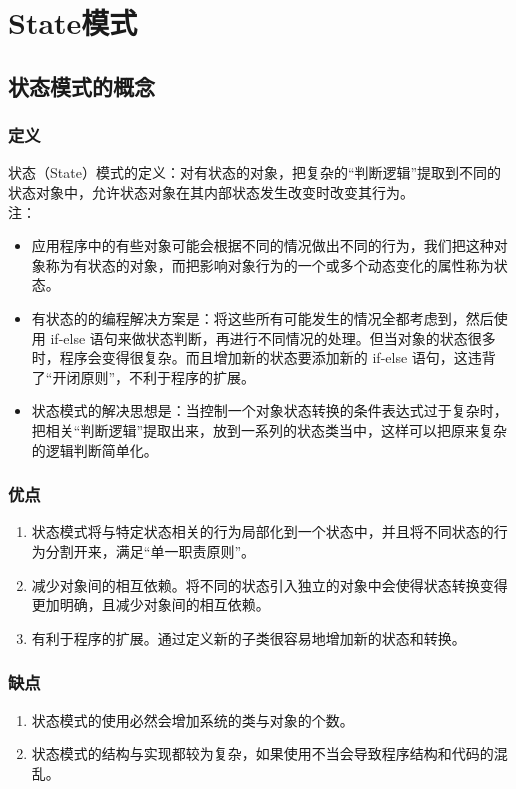 \chapter{State模式}
\section{状态模式的概念}
\subsection{定义}
状态（State）模式的定义：对有状态的对象，把复杂的“判断逻辑”提取到不同的状态对象中，允许状态对象在其内部状态发生改变时改变其行为。
\\ 注：
\begin{itemize}
	\item 应用程序中的有些对象可能会根据不同的情况做出不同的行为，我们把这种对象称为有状态的对象，而把影响对象行为的一个或多个动态变化的属性称为状态。
	\item 有状态的的编程解决方案是：将这些所有可能发生的情况全都考虑到，然后使用 if-else 语句来做状态判断，再进行不同情况的处理。但当对象的状态很多时，程序会变得很复杂。而且增加新的状态要添加新的 if-else 语句，这违背了“开闭原则”，不利于程序的扩展。
	\item 状态模式的解决思想是：当控制一个对象状态转换的条件表达式过于复杂时，把相关“判断逻辑”提取出来，放到一系列的状态类当中，这样可以把原来复杂的逻辑判断简单化。
\end{itemize}
\subsection{优点}
\begin{enumerate}
	\item 状态模式将与特定状态相关的行为局部化到一个状态中，并且将不同状态的行为分割开来，满足“单一职责原则”。
	\item 减少对象间的相互依赖。将不同的状态引入独立的对象中会使得状态转换变得更加明确，且减少对象间的相互依赖。
	\item 有利于程序的扩展。通过定义新的子类很容易地增加新的状态和转换。
\end{enumerate}
\subsection{缺点}
\begin{enumerate}
	\item 状态模式的使用必然会增加系统的类与对象的个数。
	\item 状态模式的结构与实现都较为复杂，如果使用不当会导致程序结构和代码的混乱。
\end{enumerate}
